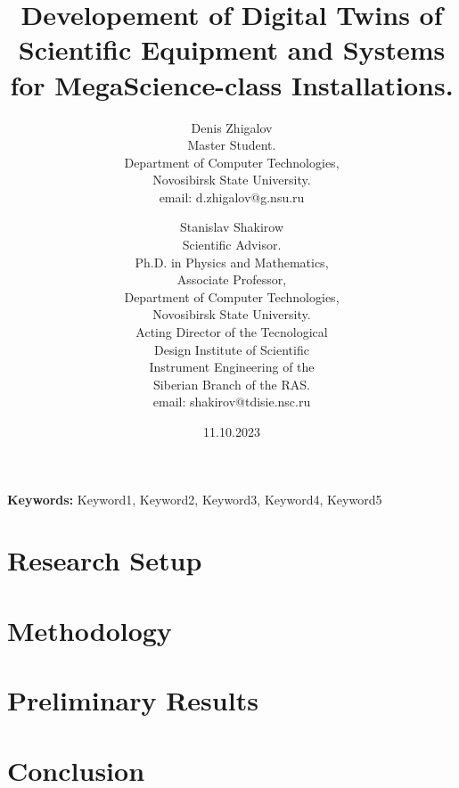 \documentclass[12pt]{article}
\begin{document}
\title{Developement of Digital Twins of Scientific Equipment and Systems for MegaScience-class Installations.}
\author{
  Denis Zhigalov\\ 
  \small{Master Student.} \\ 
  \small{Department of Computer Technologies,} \\ 
  \small{Novosibirsk State University.} \\
  \small{email: d.zhigalov@g.nsu.ru}
  \and 
  Stanislav Shakirow \\ 
  \small{Scientific Advisor.} \\
  \small{Ph.D. in Physics and Mathematics,} \\
  \small{Associate Professor,} \\
  \small{Department of Computer Technologies,} \\ 
  \small{Novosibirsk State University.} \\
  \small {Acting Director of the Tecnological} \\ 
  \small {Design Institute of Scientific} \\
  \small{Instrument Engineering of the} \\
  \small{Siberian Branch of the RAS.} \\
  \small{email: shakirov@tdisie.nsc.ru}
}
\date{11.10.2023}
\maketitle


\begin{abstract}
\end{abstract}

\textbf{Keywords:} Keyword1, Keyword2, Keyword3, Keyword4, Keyword5





\section{Research Setup}

\section{Methodology}

\section{Preliminary Results}


\section{Conclusion}



\end{document}

